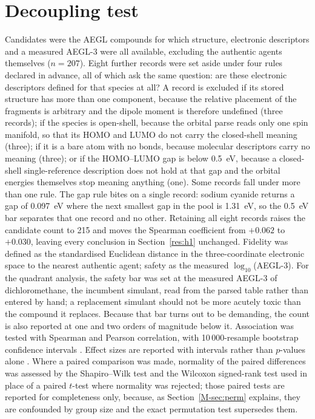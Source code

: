 \documentclass[11pt,a4paper]{article}
\begin{document}
\section{Decoupling test}
\label{meth:decoupling}
Candidates were the AEGL compounds for which structure, electronic descriptors
and a measured AEGL-3 were all available, excluding the authentic agents
themselves ($n=207$). Eight further records were set aside under four rules
declared in advance, all of which ask the same question: are these electronic
descriptors defined for that species at all? A record is excluded if
its stored structure has more than one component, because the relative placement
of the fragments is arbitrary and the dipole moment is therefore undefined
(three records); if the species is open-shell, because the orbital parse reads
only one spin manifold, so that its HOMO and LUMO do not carry the
closed-shell meaning (three); if it is a bare atom with no
bonds, because molecular descriptors carry no meaning (three); or if the
HOMO--LUMO gap is below 0.5~eV, because a closed-shell single-reference
description does not hold at that gap and the orbital energies themselves stop
meaning anything (one). Some records fall under more than one
rule. The gap rule bites on a single record: sodium cyanide returns
a gap of 0.097~eV where the next smallest gap in the pool is 1.31~eV, so the
0.5~eV bar separates that one record and no other. Retaining all eight
records raises the candidate count to 215 and moves the Spearman coefficient
from $+0.062$ to $+0.030$, leaving
every conclusion in Section~\ref{res:h1} unchanged. Fidelity was defined as the standardised
Euclidean distance in the three-coordinate electronic space to the nearest
authentic agent; safety as the measured $\log_{10}$(AEGL-3). For the quadrant analysis, the safety bar
was set at the measured AEGL-3 of dichloromethane, the incumbent
simulant, read from the parsed table rather than entered by hand; a replacement
simulant should not be more acutely toxic than the compound it replaces. Because
that bar turns out to be demanding, the count is also reported at one and two
orders of magnitude below it. Association was tested with Spearman and
Pearson correlation, with 10\,000-resample bootstrap confidence intervals
\cite{efron1986}. Effect sizes are reported with intervals rather than
$p$-values alone \cite{nakagawa2007}. Where a paired comparison was made,
normality of the paired differences was assessed by the Shapiro--Wilk test
\cite{shapiro1965} and the Wilcoxon signed-rank test \cite{wilcoxon1945} used
in place of a paired $t$-test where normality was rejected; those paired tests
are reported for completeness only, because, as Section~\ref{M-sec:perm} explains,
they are confounded by group size and the exact permutation test supersedes them.
\end{document}
